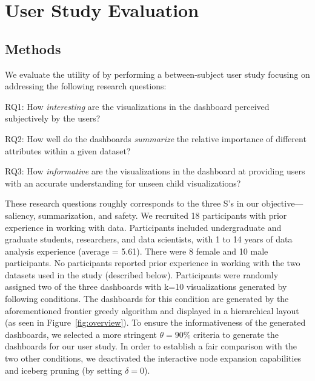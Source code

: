 \section{User Study Evaluation\label{sec:userstudy}}
\subsection{Methods}
We evaluate the utility of \system by performing a between-subject user study focusing on addressing the following research questions:
\begin{denselist}
	\item RQ1: How \textit{interesting} are the visualizations in the dashboard perceived subjectively by the users?
	\item RQ2: How well do the dashboards \textit{summarize} the relative importance of different attributes within a given dataset?
	\item RQ3: How \textit{informative} are the visualizations in the dashboard at providing users with an accurate understanding for unseen child visualizations? %
\end{denselist}
These research questions roughly corresponds to the three S's in our objective---saliency, summarization, and safety.
We recruited 18 participants with prior experience in working with data. Participants included undergraduate and graduate students, researchers, and data scientists, with 1 to 14 years of data analysis experience (average = 5.61).  %
There were 8 female and 10 male participants. No participants reported prior experience in working with the two datasets used in the study (described below). Participants were randomly assigned two of the three dashboards with k=10 visualizations generated by following conditions. 
\stitle{\system:} The dashboards for this condition are generated by the aforementioned frontier greedy algorithm and displayed in a hierarchical layout (as seen in Figure~\ref{fig:overview}). To ensure the informativeness of the generated dashboards, we selected a more stringent $\theta=90\%$ criteria to generate the dashboards for our user study. In order to establish a fair comparison with the two other conditions, we deactivated the interactive node expansion capabilities and iceberg pruning (by setting $\delta=0$).
